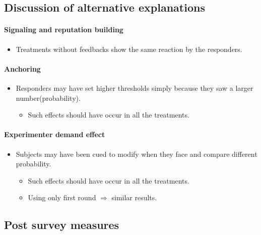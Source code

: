 \documentclass[../root]{subfiles}
\begin{document}
    \subsection{Discussion of alternative explanations}

    \paragraph{Signaling and reputation building}

    \begin{itemize}
      \item Treatments without feedbacks show the same reaction by the responders.
    \end{itemize}

    \paragraph{Anchoring}

    \begin{itemize}
      \item Responders may have set higher thresholds simply because they saw a larger number(probability).
      \begin{itemize}
        \item Such effects should have occur in all the treatments.
      \end{itemize}
    \end{itemize}

    \paragraph{Experimenter demand effect}

    \begin{itemize}
      \item Subjects may have been cued to modify when they face and compare different probability.
      \begin{itemize}
        \item Such effects should have occur in all the treatments.
        \item Using only first round $\Rightarrow$ similar results.
      \end{itemize}
    \end{itemize}

    \subsection{Post survey measures}
\end{document}
